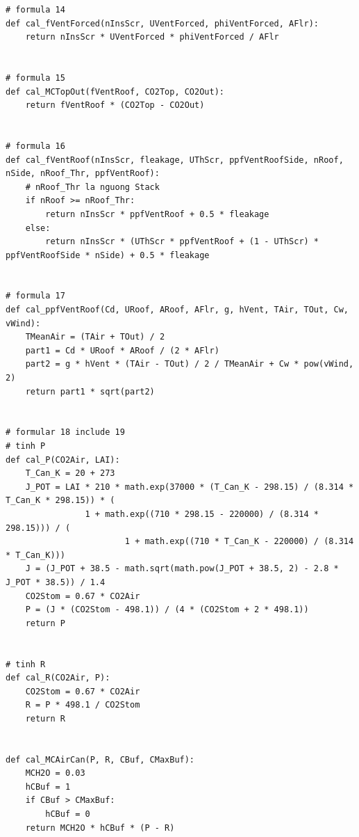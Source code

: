 \documentclass[a4paper]{article}
\begin{document}
\begin{verbatim}
# formula 14
def cal_fVentForced(nInsScr, UVentForced, phiVentForced, AFlr):
    return nInsScr * UVentForced * phiVentForced / AFlr


# formula 15
def cal_MCTopOut(fVentRoof, CO2Top, CO2Out):
    return fVentRoof * (CO2Top - CO2Out)


# formula 16
def cal_fVentRoof(nInsScr, fleakage, UThScr, ppfVentRoofSide, nRoof, nSide, nRoof_Thr, ppfVentRoof):
    # nRoof_Thr la nguong Stack
    if nRoof >= nRoof_Thr:
        return nInsScr * ppfVentRoof + 0.5 * fleakage
    else:
        return nInsScr * (UThScr * ppfVentRoof + (1 - UThScr) * ppfVentRoofSide * nSide) + 0.5 * fleakage


# formula 17
def cal_ppfVentRoof(Cd, URoof, ARoof, AFlr, g, hVent, TAir, TOut, Cw, vWind):
    TMeanAir = (TAir + TOut) / 2
    part1 = Cd * URoof * ARoof / (2 * AFlr)
    part2 = g * hVent * (TAir - TOut) / 2 / TMeanAir + Cw * pow(vWind, 2)
    return part1 * sqrt(part2)


# formular 18 include 19
# tinh P
def cal_P(CO2Air, LAI):
    T_Can_K = 20 + 273
    J_POT = LAI * 210 * math.exp(37000 * (T_Can_K - 298.15) / (8.314 * T_Can_K * 298.15)) * (
                1 + math.exp((710 * 298.15 - 220000) / (8.314 * 298.15))) / (
                        1 + math.exp((710 * T_Can_K - 220000) / (8.314 * T_Can_K)))
    J = (J_POT + 38.5 - math.sqrt(math.pow(J_POT + 38.5, 2) - 2.8 * J_POT * 38.5)) / 1.4
    CO2Stom = 0.67 * CO2Air
    P = (J * (CO2Stom - 498.1)) / (4 * (CO2Stom + 2 * 498.1))
    return P


# tinh R
def cal_R(CO2Air, P):
    CO2Stom = 0.67 * CO2Air
    R = P * 498.1 / CO2Stom
    return R


def cal_MCAirCan(P, R, CBuf, CMaxBuf):
    MCH2O = 0.03
    hCBuf = 1
    if CBuf > CMaxBuf:
        hCBuf = 0
    return MCH2O * hCBuf * (P - R)


\end{verbatim}
\end{document}
